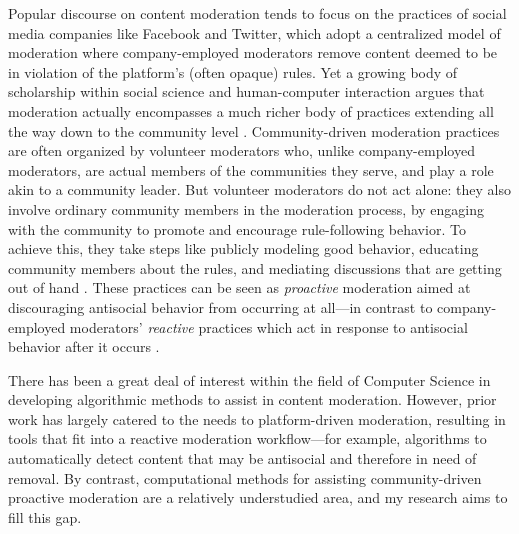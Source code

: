 \documentclass[11pt,letterpaper]{article}
\begin{document}
Popular discourse on content moderation tends to focus on the practices of social media companies like Facebook and Twitter, which adopt a centralized model of moderation where company-employed moderators remove content deemed to be in violation of the platform's (often opaque) rules.
Yet a growing body of scholarship within social science and human-computer interaction argues that moderation actually encompasses a much richer body of practices extending all the way down to the community level \cite{brewer_inclusion_2020,lampe_slashdot_2004,seering_reconsidering_2020}.
Community-driven moderation practices are often organized by volunteer moderators who, unlike company-employed moderators, are actual members of the communities they serve, and play a role akin to a community leader.
But volunteer moderators do not act alone: they also involve ordinary community members in the moderation process, by engaging with the community to promote and encourage rule-following behavior.
To achieve this, they take steps like publicly modeling good behavior, educating community members about the rules, and mediating discussions that are getting out of hand \cite{seering_shaping_2017,billings_understanding_2010}.
These practices can be seen as \emph{proactive} moderation aimed at discouraging antisocial behavior from occurring at all---in contrast to company-employed moderators' \emph{reactive} practices which act in response to antisocial behavior after it occurs \cite{lo_when_2018}.

There has been a great deal of interest within the field of Computer Science in developing algorithmic methods to assist in content moderation.
However, prior work has largely catered to the needs to platform-driven moderation, resulting in tools that fit into a reactive moderation workflow---for example, algorithms to automatically detect content that may be antisocial and therefore in need of removal.
By contrast, computational methods for assisting community-driven proactive moderation are a relatively understudied area, and my research aims to fill this gap.


\end{document}
